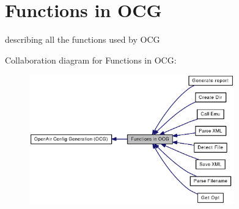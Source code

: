 \section{Functions in OCG}
\label{group____fn}
describing all the functions used by OCG  




Collaboration diagram for Functions in OCG:\nopagebreak
\begin{figure}[H]
\begin{center}
\leavevmode
\includegraphics[width=251pt]{group____fn}
\end{center}
\end{figure}
